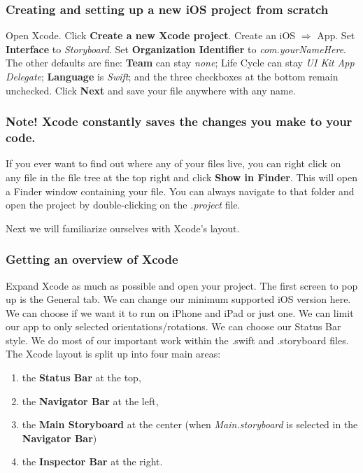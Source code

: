 \documentclass[12pt, letterpaper]{article}
\begin{document}
\subsubsection*{Creating and setting up a new iOS project from scratch}

Open Xcode. Click \textbf{Create a new Xcode project}. Create an iOS $\Rightarrow$ App. 
Set \textbf{Interface} to \emph{Storyboard}. Set \textbf{Organization Identifier} to 
\emph{com.yourNameHere}. The other defaults are fine: \textbf{Team} can stay \emph{none}; Life Cycle can stay
\emph{UI Kit App Delegate}; \textbf{Language} is \emph{Swift}; and the three checkboxes at the
bottom remain unchecked. Click \textbf{Next} and save your file anywhere with any name. \\

\subsubsection*{Note! Xcode constantly saves the changes you make to your code.}

If you ever want to find out where any of your files live, you can right click on any file in the 
file tree at the top right and click \textbf{Show in Finder}. This will open a Finder window 
containing your file. You can always navigate to that folder and open the project by double-clicking
on the \emph{.project} file.

Next we will familiarize ourselves with Xcode's layout.

\subsubsection*{Getting an overview of Xcode}

Expand Xcode as much as possible and open your project. The first screen to pop up is the General tab.
We can change our minimum supported iOS version here. We can choose if we want it to run on iPhone
and iPad or just one. We can limit our app to only selected orientations/rotations. We can choose
our Status Bar style. We do most of our important work within the .swift and .storyboard files. \\

The Xcode layout is split up into four main  areas: 
\begin{enumerate}
    \itemsep0em
    \item{the \textbf{ Status Bar} at the top,} 
    \item{the \textbf{Navigator Bar} at the left,}
    \item{the \textbf{Main Storyboard} at the center (when \emph{Main.storyboard} is selected in the
        \textbf{Navigator Bar})}
    \item{the \textbf{Inspector Bar} at the right.}
\end{enumerate}
\end{document}
